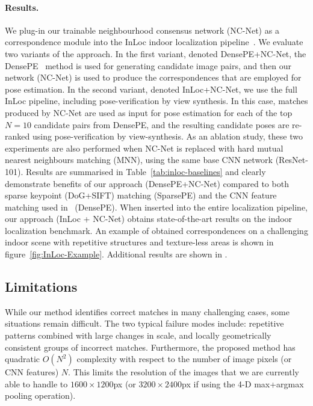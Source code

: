 \documentclass{article}
\begin{document}
\paragraph{Results.}
We plug-in our trainable neighbourhood consensus network (NC-Net) as a correspondence module into the InLoc indoor localization pipeline~\cite{Taira18}. We evaluate two variants of the approach. In the first variant, denoted DensePE+NC-Net, 
the DensePE~\cite{Taira18} method is used for generating candidate image pairs, and then our network (NC-Net) is used to produce the correspondences that are employed for pose estimation.
In the second variant, denoted InLoc+NC-Net, we use the full InLoc pipeline, including pose-verification by view synthesis. In this case, matches produced by NC-Net are used as input for pose estimation for each of the top $N=10$ candidate pairs from DensePE, and the resulting candidate poses are re-ranked using pose-verification by view-synthesis.
As an ablation study, these two experiments are also performed when NC-Net is replaced with hard mutual nearest neighbours matching (MNN), using the same base CNN network (ResNet-101).
Results are summarised in Table~\ref{tab:inloc-baselines} and clearly demonstrate benefits of our approach ({DensePE+NC-Net}) compared to both sparse keypoint (DoG+SIFT) matching ({SparsePE}) and the CNN feature matching used in~\cite{Taira18} ({DensePE}). When inserted into the entire localization pipeline, our approach ({InLoc + NC-Net}) obtains state-of-the-art results on the indoor localization benchmark.
An example of obtained correspondences on a challenging indoor scene with repetitive structures and texture-less areas is shown in figure~\ref{fig:InLoc-Example}. 
Additional results are shown in .

\subsection{Limitations}
While our method identifies correct matches in many challenging cases, some situations remain difficult. The two typical failure modes include: repetitive patterns combined with large changes in scale, and locally geometrically consistent groups of incorrect matches. Furthermore, the proposed method has quadratic $O(N^2)$ complexity with respect to the number of image pixels (or CNN features) $N$. This limits the resolution of the images that we are currently able to handle to $1600\times1200$px (or $3200\times2400$px if using the 4-D max+argmax pooling operation).
\end{document}
